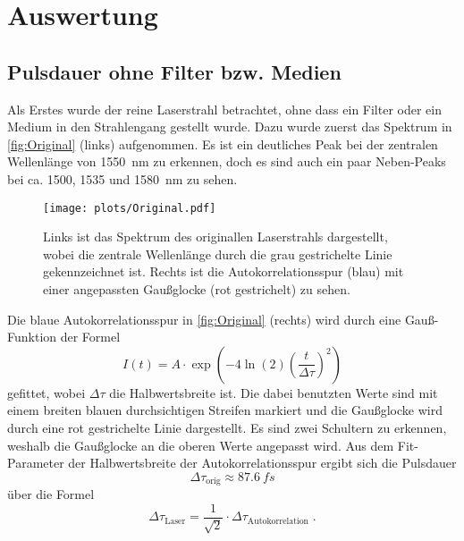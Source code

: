 \newpage
\section{Auswertung}
\label{sec:auswertung}
\subsection{Pulsdauer ohne Filter bzw. Medien}
    Als Erstes wurde der reine Laserstrahl betrachtet, ohne dass ein Filter oder ein Medium in den Strahlengang gestellt wurde.
    Dazu wurde zuerst das Spektrum in \autoref{fig:Original} (links) aufgenommen.
    Es ist ein deutliches Peak bei der zentralen Wellenlänge von \qty{1550}{nm} zu erkennen, doch es sind auch ein paar Neben-Peaks bei ca. 1500, 1535 und \qty{1580}{nm} zu sehen.
    \vspace*{-0.3cm}
    \begin{figure}[ht]
        \centering\captionsetup{format=plain}
        \texttt{[image: plots/Original.pdf]} \vspace*{-0.5cm}
        \caption{Links ist das Spektrum des originallen Laserstrahls dargestellt, wobei die zentrale Wellenlänge durch die grau gestrichelte Linie gekennzeichnet ist. Rechts ist die Autokorrelationsspur (blau) mit einer angepassten Gaußglocke (rot gestrichelt) zu sehen.}
        \label{fig:Original}
    \end{figure}
    \FloatBarrier
    Die blaue Autokorrelationsspur in \autoref{fig:Original} (rechts) wird durch eine Gauß-Funktion der Formel
    \begin{equation}
        I(t) = A \cdot \exp\left(-4\ln(2)\left(\frac{t}{\Delta\tau}\right)^2\right)
    \end{equation}
    gefittet, wobei $\Delta\tau$ die Halbwertsbreite ist.
    Die dabei benutzten Werte sind mit einem breiten blauen durchsichtigen Streifen markiert und die Gaußglocke wird durch eine rot gestrichelte Linie dargestellt.
    Es sind zwei Schultern zu erkennen, weshalb die Gaußglocke an die oberen Werte angepasst wird.
    Aus dem Fit-Parameter der Halbwertsbreite der Autokorrelationsspur ergibt sich die Pulsdauer
    \begin{equation*}
        \Delta \tau_{\mathrm{orig}} \approx \qty{87,6}{fs}
    \end{equation*}
    über die Formel
    \begin{equation}
        \Delta \tau_{\mathrm{Laser}} = \frac{1}{\sqrt{2}} \cdot \Delta \tau_{\mathrm{Autokorrelation}}\;.
    \end{equation}

